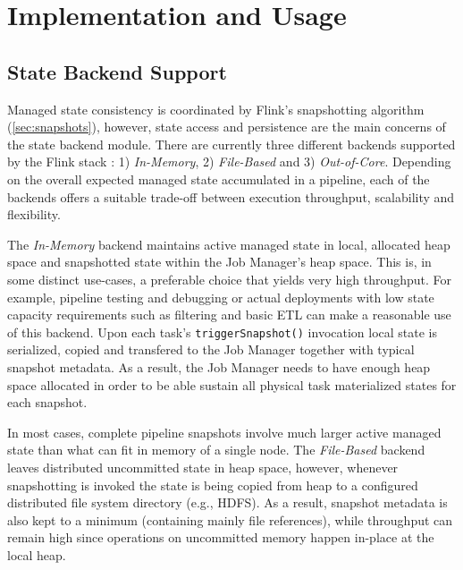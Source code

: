 

\section{Implementation and Usage}
\label{sec:implementation}


\subsection{State Backend Support}

Managed state consistency is coordinated by Flink's snapshotting algorithm (\autoref{sec:snapshots}), however, state access and persistence are the main concerns of the state backend module. There are currently three different backends supported by the Flink stack : 1) \emph{In-Memory}, 2) \emph{File-Based} and 3) \emph{Out-of-Core}. Depending on the overall expected managed state accumulated in a pipeline, each of the backends offers a suitable trade-off between execution throughput, scalability and flexibility.

The \emph{In-Memory} backend maintains active managed state in local, allocated heap space and snapshotted state within the Job Manager's heap space. This is, in some distinct use-cases, a preferable choice that yields very high throughput. For example, pipeline testing and debugging or actual deployments with low state capacity requirements such as filtering and basic ETL can make a reasonable use of this backend. Upon each task's \texttt{triggerSnapshot()} invocation local state is serialized, copied and transfered to the Job Manager together with typical snapshot metadata. As a result, the Job Manager needs to have enough heap space allocated in order to be able sustain all physical task materialized states for each snapshot.

In most cases, complete pipeline snapshots involve much larger active managed state than what can fit in memory of a single node. The \emph{File-Based} backend leaves distributed uncommitted state in heap space, however, whenever snapshotting is invoked the state is being copied from heap to a configured distributed file system directory (e.g., HDFS). As a result, snapshot metadata is also kept to a minimum (containing mainly file references), while throughput can remain high since operations on uncommitted memory happen in-place at the local heap.

